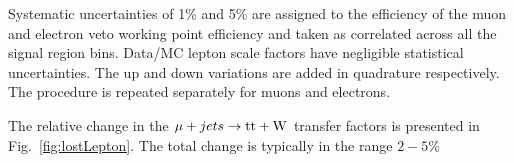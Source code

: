 Systematic uncertainties of 1\% and 5\% are assigned to the efficiency of the muon and electron veto working point efficiency and taken as correlated across all the signal region bins. 
Data/MC lepton scale factors have negligible statistical uncertainties. 
The up and down variations are added in quadrature respectively. 
The procedure is repeated separately for muons and
electrons. 

The relative change in the $\mu + jets \rightarrow \mathrm{tt+W}$ transfer factors 
is presented in Fig.~\ref{fig:lostLepton}. The
total change is typically in the range $2-5\%$

\begin{figure}[!h]
  \centering
   ~~
  \\
\end{figure}
